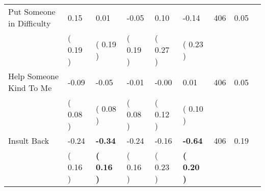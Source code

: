 \begin{tabular}{L{6.2cm} C{1.8cm} C{1.8cm} C{1.8cm} C{1.8cm} C{1.8cm} C{1.8cm} C{0.3cm} C{0.3cm}}
Put Someone in Difficulty &      0.15 &      0.01 &     -0.05 &      0.10 &     -0.14  & 406 &       0.05 \\ 
 & (     0.19 ) & (     0.19 ) & (     0.19 ) & (     0.27 ) & (     0.23 )  & \\
Help Someone Kind To Me &     -0.09 &     -0.05 &     -0.01 &     -0.00 &      0.01  & 406 &       0.05 \\ 
 & (     0.08 ) & (     0.08 ) & (     0.08 ) & (     0.12 ) & (     0.10 )  & \\
Insult Back &     -0.24 & \textbf{    -0.34} &     -0.24 &     -0.16 & \textbf{    -0.64}  & 406 &       0.19 \\ 
 & (     0.16 ) & \textbf{(     0.16 )} & (     0.16 ) & (     0.23 ) & \textbf{(     0.20 )}  & \\
\bottomrule
\end{tabular}
